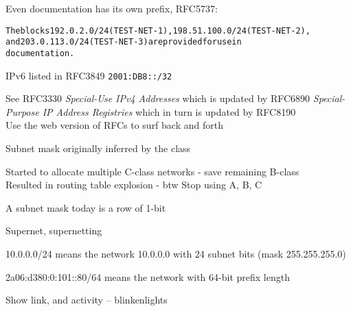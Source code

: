 \documentclass[Screen16to9,17pt]{foils}
\begin{document}

Even documentation has its own prefix, RFC5737:
\begin{alltt}
The blocks 192.0.2.0/24 (TEST-NET-1), 198.51.100.0/24 (TEST-NET-2),
and 203.0.113.0/24 (TEST-NET-3) are provided for use in
documentation.
\end{alltt}

IPv6 listed in RFC3849 \verb+2001:DB8::/32+

See RFC3330 \emph{Special-Use IPv4 Addresses} which is updated by
RFC6890 \emph{Special-Purpose IP Address Registries} which in turn is updated by RFC8190\\
Use the web version of RFCs to surf back and forth 




\begin{list2}
\item Subnet mask originally inferred by the class
\item Started to allocate multiple C-class networks - save remaining B-class\\
Resulted in routing table explosion - btw Stop using A, B, C
\item A subnet mask today is a row of 1-bit
\item Supernet, supernetting
\item 10.0.0.0/24 means the network 10.0.0.0 with 24 subnet bits (mask 255.255.255.0)
\item 2a06:d380:0:101::80/64 means the network with 64-bit prefix length
\end{list2}






\centerline{Show link, and activity -- blinkenlights}



\end{document}
